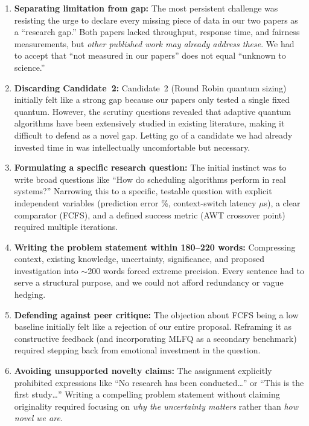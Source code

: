 \documentclass[11pt, a4paper]{article}
\begin{document}
\begin{enumerate}[nosep]
    \item \textbf{Separating limitation from gap:} The most persistent challenge was resisting the urge to declare every missing piece of data in our two papers as a ``research gap.'' Both papers lacked throughput, response time, and fairness measurements, but \emph{other published work may already address these}. We had to accept that ``not measured in our papers'' does not equal ``unknown to science.''

    \item \textbf{Discarding Candidate~2:} Candidate~2 (Round Robin quantum sizing) initially felt like a strong gap because our papers only tested a single fixed quantum. However, the scrutiny questions revealed that adaptive quantum algorithms have been extensively studied in existing literature, making it difficult to defend as a novel gap. Letting go of a candidate we had already invested time in was intellectually uncomfortable but necessary.

    \item \textbf{Formulating a specific research question:} The initial instinct was to write broad questions like ``How do scheduling algorithms perform in real systems?'' Narrowing this to a specific, testable question with explicit independent variables (prediction error \%, context-switch latency $\mu$s), a clear comparator (FCFS), and a defined success metric (AWT crossover point) required multiple iterations.

    \item \textbf{Writing the problem statement within 180--220 words:} Compressing context, existing knowledge, uncertainty, significance, and proposed investigation into $\sim$200 words forced extreme precision. Every sentence had to serve a structural purpose, and we could not afford redundancy or vague hedging.

    \item \textbf{Defending against peer critique:} The objection about FCFS being a low baseline initially felt like a rejection of our entire proposal. Reframing it as constructive feedback (and incorporating MLFQ as a secondary benchmark) required stepping back from emotional investment in the question.

    \item \textbf{Avoiding unsupported novelty claims:} The assignment explicitly prohibited expressions like ``No research has been conducted\ldots'' or ``This is the first study\ldots'' Writing a compelling problem statement without claiming originality required focusing on \emph{why the uncertainty matters} rather than \emph{how novel we are}.
\end{enumerate}
\end{document}

